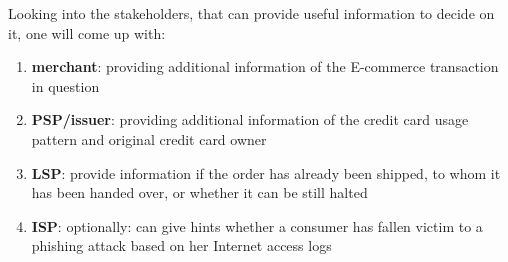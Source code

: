 Looking into the stakeholders, that can provide useful information to decide on it, one will come up with:\@

\begin{enumerate}
    \item \textbf{merchant}: providing additional information of the E-commerce transaction in question
    \item \textbf{\gls{PSP}/issuer}: providing additional information of the credit card usage pattern and original credit card owner
    \item \textbf{\gls{LSP}}: provide information if the order has already been shipped, to whom it has been handed over, or whether it can be still halted
    \item \textbf{\gls{ISP}}: optionally: can give hints whether a consumer has fallen victim to a phishing attack based on her Internet access logs
\end{enumerate}

